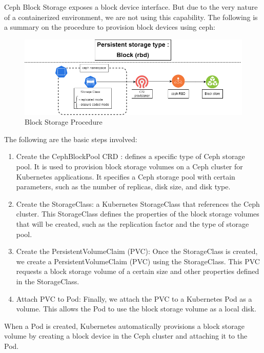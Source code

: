 
Ceph Block Storage exposes a block device interface. But due to the very nature of a containerized environment, we are not using this capability. The following is a summary on the procedure to provision block devices using ceph: 

\begin{figure}[H]\centering
\includegraphics[width=1.0\textwidth,angle=00]{assets/f33.png}
\caption{Block Storage Procedure}
\label{fig:Block Storage Procedure}
\end{figure}

The following are the basic steps involved: 

\begin{enumerate}[label = (\arabic*)]
\item Create the CephBlockPool CRD : defines a specific type of Ceph storage pool. It is used to provision block storage volumes on a Ceph cluster for Kubernetes applications. It specifies a Ceph storage pool with certain parameters, such as the number of replicas, disk size, and disk type. 
\item Create the StorageClass: a Kubernetes StorageClass that references the Ceph cluster. This StorageClass defines the properties of the block storage volumes that will be created, such as the replication factor and the type of storage pool. 
\item Create the PersistentVolumeClaim (PVC): Once the StorageClass is created, we create a PersistentVolumeClaim (PVC) using the StorageClass. This PVC requests a block storage volume of a certain size and other properties defined in the StorageClass. 
\item Attach PVC to Pod: Finally, we attach the PVC to a Kubernetes Pod as a volume. This allows the Pod to use the block storage volume as a local disk. 
\end{enumerate}

When a Pod is created, Kubernetes automatically provisions a block storage volume by creating a block device in the Ceph cluster and attaching it to the Pod. 

